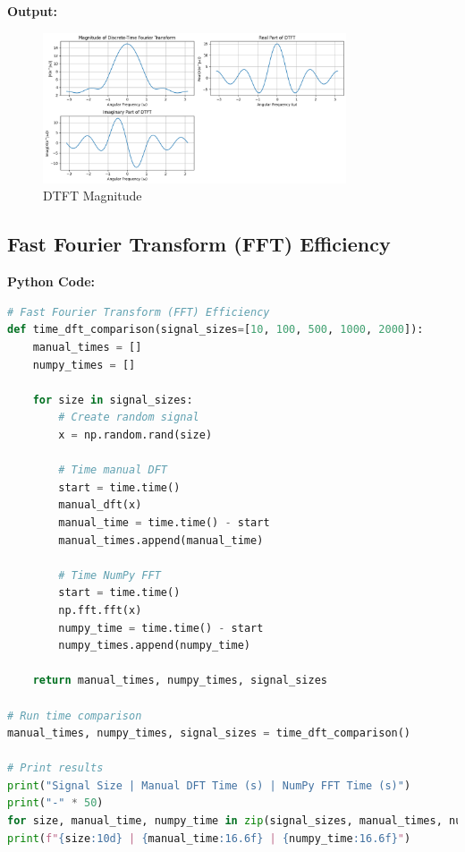 \documentclass[a4paper,12pt]{article}
\begin{document}
\textbf{Output:}
\begin{figure}[h]
    \centering
    \includegraphics[width=0.8\textwidth]{4.png}
    \caption{DTFT Magnitude}
    \label{fig:dtft}
\end{figure}

\subsection*{Fast Fourier Transform (FFT) Efficiency}

\textbf{Python Code:}
\begin{lstlisting}[language=Python, caption=FFT Efficiency Comparison]
# Fast Fourier Transform (FFT) Efficiency
def time_dft_comparison(signal_sizes=[10, 100, 500, 1000, 2000]):
    manual_times = []
    numpy_times = []

    for size in signal_sizes:
        # Create random signal
        x = np.random.rand(size)

        # Time manual DFT
        start = time.time()
        manual_dft(x)
        manual_time = time.time() - start
        manual_times.append(manual_time)

        # Time NumPy FFT
        start = time.time()
        np.fft.fft(x)
        numpy_time = time.time() - start
        numpy_times.append(numpy_time)

    return manual_times, numpy_times, signal_sizes

# Run time comparison
manual_times, numpy_times, signal_sizes = time_dft_comparison()
    
# Print results
print("Signal Size | Manual DFT Time (s) | NumPy FFT Time (s)")
print("-" * 50)
for size, manual_time, numpy_time in zip(signal_sizes, manual_times, numpy_times):
print(f"{size:10d} | {manual_time:16.6f} | {numpy_time:16.6f}")
\end{lstlisting}
\end{document}
